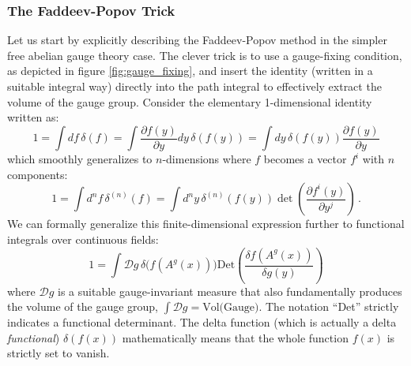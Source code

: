 \subsubsection{The Faddeev-Popov Trick}

Let us start by explicitly describing the Faddeev-Popov method in the simpler free abelian gauge theory case. The clever trick is to use a gauge-fixing condition, as depicted in figure \ref{fig:gauge_fixing}, and insert the identity (written in a suitable integral way) directly into the path integral to effectively extract the volume of the gauge group. Consider the elementary 1-dimensional identity written as:
\[1 = \int df \, \delta(f) = \int \frac{\partial f(y)}{\partial y} dy \, \delta(f(y)) = \int dy \, \delta(f(y)) \frac{\partial f(y)}{\partial y}\]
which smoothly generalizes to \(n\)-dimensions where \(f\) becomes a vector \(f^i\) with \(n\) components:
\[1 = \int d^n f \, \delta^{(n)}(f) = \int d^n y \, \delta^{(n)}(f(y)) \det \left( \frac{\partial f^i(y)}{\partial y^j} \right) \, .\]
We can formally generalize this finite-dimensional expression further to functional integrals over continuous fields:
\begin{equation} \label{eq:fp_identity}
    1 = \int \mathcal{D}g \, \delta\Big(f(A^g(x))\Big) \text{Det} \left( \frac{\delta f(A^g(x))}{\delta g(y)} \right)
\end{equation}
where \(\mathcal{D}g\) is a suitable gauge-invariant measure that also fundamentally produces the volume of the gauge group, \(\int \mathcal{D}g = \text{Vol(Gauge)}\). The notation ``Det'' strictly indicates a functional determinant. The delta function (which is actually a delta \textit{functional}) \(\delta(f(x))\) mathematically means that the whole function \(f(x)\) is strictly set to vanish.

